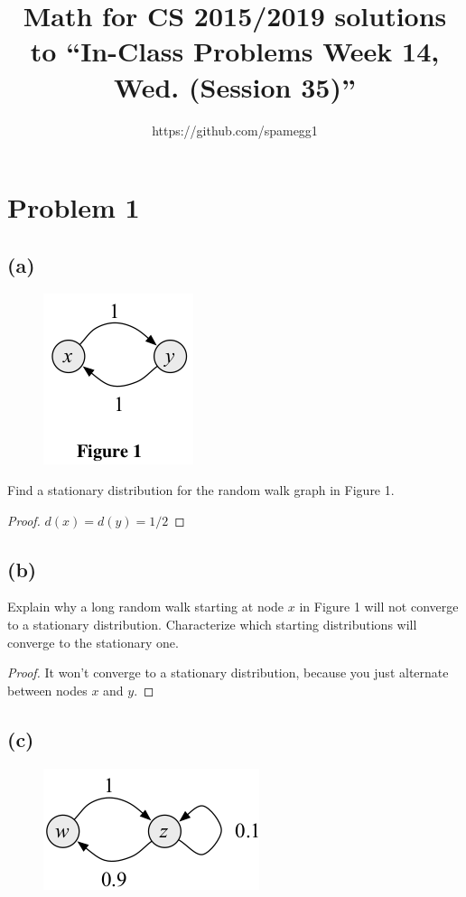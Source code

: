 \documentclass[14pt]{extarticle}
\title{Math for CS 2015/2019 solutions to ``In-Class Problems Week 14, Wed. (Session 35)''}
\author{https://github.com/spamegg1}
\begin{document}
\maketitle
\tableofcontents

\section{Problem 1}
\subsection{(a)}
\begin{figure}[ht!]
\centering
\includegraphics[scale=0.6]{random-walk-1.png}
\end{figure}
Find a stationary distribution for the random walk graph in Figure 1.

\begin{proof}
$d(x) = d(y) = 1/2$
\end{proof}

\subsection{(b)}
Explain why a long random walk starting at node $x$ in Figure 1 will not converge to a stationary distribution. Characterize which starting distributions will converge to the stationary one.

\begin{proof}
It won't converge to a stationary distribution, because you just alternate between nodes $x$ and $y$.
\end{proof}

\subsection{(c)}
\begin{figure}[ht!]
\centering
\includegraphics[scale=0.6]{random-walk-2.png}
\end{figure}
\end{document}
